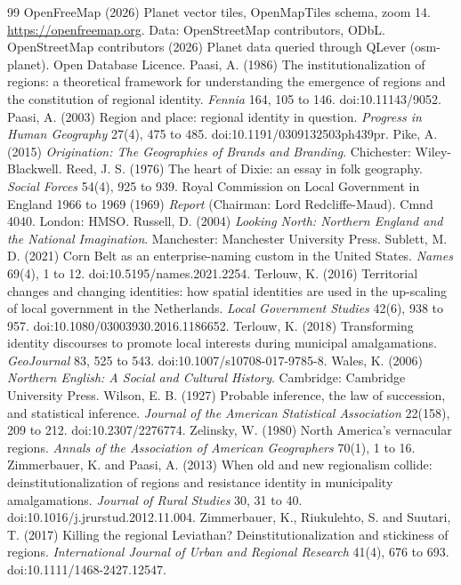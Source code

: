 \documentclass[11pt,a4paper]{article}
\begin{document}
\begin{thebibliography}{99}
 OpenFreeMap (2026) Planet vector tiles, OpenMapTiles schema, zoom 14. \url{https://openfreemap.org}. Data: OpenStreetMap contributors, ODbL.
 OpenStreetMap contributors (2026) Planet data queried through QLever (osm-planet). Open Database Licence.
 Paasi, A. (1986) The institutionalization of regions: a theoretical framework for understanding the emergence of regions and the constitution of regional identity. \textit{Fennia} 164, 105 to 146. doi:10.11143/9052.
 Paasi, A. (2003) Region and place: regional identity in question. \textit{Progress in Human Geography} 27(4), 475 to 485. doi:10.1191/0309132503ph439pr.
 Pike, A. (2015) \textit{Origination: The Geographies of Brands and Branding}. Chichester: Wiley-Blackwell.
 Reed, J. S. (1976) The heart of Dixie: an essay in folk geography. \textit{Social Forces} 54(4), 925 to 939.
 Royal Commission on Local Government in England 1966 to 1969 (1969) \textit{Report} (Chairman: Lord Redcliffe-Maud). Cmnd 4040. London: HMSO.
 Russell, D. (2004) \textit{Looking North: Northern England and the National Imagination}. Manchester: Manchester University Press.
 Sublett, M. D. (2021) Corn Belt as an enterprise-naming custom in the United States. \textit{Names} 69(4), 1 to 12. doi:10.5195/names.2021.2254.
 Terlouw, K. (2016) Territorial changes and changing identities: how spatial identities are used in the up-scaling of local government in the Netherlands. \textit{Local Government Studies} 42(6), 938 to 957. doi:10.1080/03003930.2016.1186652.
 Terlouw, K. (2018) Transforming identity discourses to promote local interests during municipal amalgamations. \textit{GeoJournal} 83, 525 to 543. doi:10.1007/s10708-017-9785-8.
 Wales, K. (2006) \textit{Northern English: A Social and Cultural History}. Cambridge: Cambridge University Press.
 Wilson, E. B. (1927) Probable inference, the law of succession, and statistical inference. \textit{Journal of the American Statistical Association} 22(158), 209 to 212. doi:10.2307/2276774.
 Zelinsky, W. (1980) North America's vernacular regions. \textit{Annals of the Association of American Geographers} 70(1), 1 to 16.
 Zimmerbauer, K. and Paasi, A. (2013) When old and new regionalism collide: deinstitutionalization of regions and resistance identity in municipality amalgamations. \textit{Journal of Rural Studies} 30, 31 to 40. doi:10.1016/j.jrurstud.2012.11.004.
 Zimmerbauer, K., Riukulehto, S. and Suutari, T. (2017) Killing the regional Leviathan? Deinstitutionalization and stickiness of regions. \textit{International Journal of Urban and Regional Research} 41(4), 676 to 693. doi:10.1111/1468-2427.12547.
\end{thebibliography}
\end{document}
